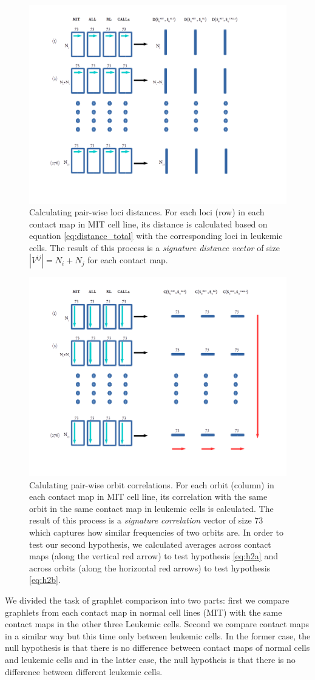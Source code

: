 \documentclass[a4,center,fleqn]{NAR}
\begin{document}
\begin{figure}
    \centering
    \includegraphics[width=.5\textwidth]{figures/graphlet_distance_schema.png}
    \caption{Calculating pair-wise loci distances. For each loci (row) 
    in each
    contact map in MIT cell line, its distance is calculated based on
    equation \ref{eq:distance_total} with the corresponding loci in
    leukemic cells. The result of this process is a 
    \textit{signature distance vector} of size
    $|V^{ij}| = N_i+N_j$ for each contact map.
    }
    \label{graphlet_distance_schema}
\end{figure}
\begin{figure}
    \centering
    \includegraphics[width=.5\textwidth]{figures/graphlet_correlation_schema.png}
    \caption{Calulating pair-wise orbit correlations. For each orbit (column)
    in each contact map in MIT cell line, its correlation with the
    same orbit in the same contact map 
    in leukemic cells is calculated. The result of
    this process is a \textit{signature correlation} vector of size
    73 which captures how similar frequencies of two orbits are.
    In order to test our second hypothesis, we calculated averages
    across contact maps (along the vertical red arrow) to test 
    hypothesis \ref{eq:h2a}
    and across orbits
    (along the horizontal red arrows) to test hypothesis \ref{eq:h2b}.}
    \label{graphlet_correlation_schema}
\end{figure}

We divided the task of graphlet comparison into two parts: first we compare
graphlets from each contact map in normal cell lines (MIT) with the 
same contact maps in the other three Leukemic cells. Second we compare 
contact maps in a similar way but this time only between leukemic cells.
In the former case, the null hypothesis is that there is no difference
between contact maps of normal cells and leukemic cells and in the latter
case, the null hypotheis is that there is no difference between 
different leukemic cells.
\end{document}
